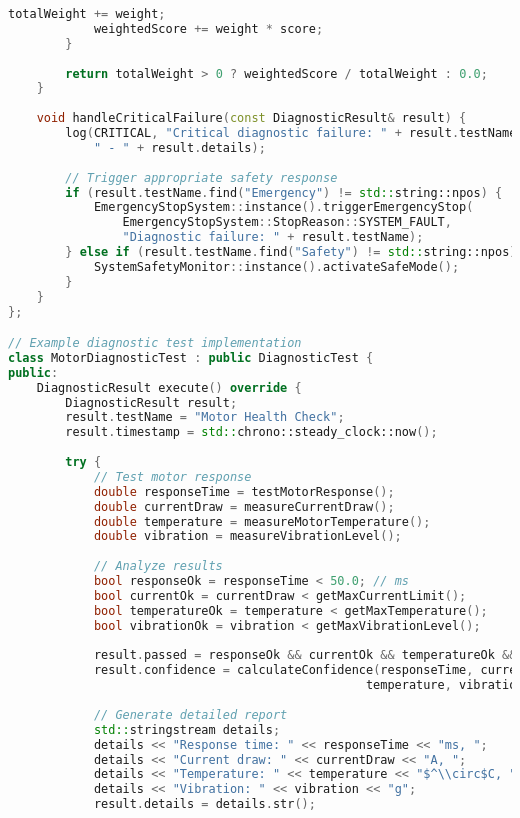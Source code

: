 \begin{lstlisting}[language=C++, caption=Self-Diagnostic System]
            totalWeight += weight;
            weightedScore += weight * score;
        }
        
        return totalWeight > 0 ? weightedScore / totalWeight : 0.0;
    }
    
    void handleCriticalFailure(const DiagnosticResult& result) {
        log(CRITICAL, "Critical diagnostic failure: " + result.testName + 
            " - " + result.details);
        
        // Trigger appropriate safety response
        if (result.testName.find("Emergency") != std::string::npos) {
            EmergencyStopSystem::instance().triggerEmergencyStop(
                EmergencyStopSystem::StopReason::SYSTEM_FAULT,
                "Diagnostic failure: " + result.testName);
        } else if (result.testName.find("Safety") != std::string::npos) {
            SystemSafetyMonitor::instance().activateSafeMode();
        }
    }
};

// Example diagnostic test implementation
class MotorDiagnosticTest : public DiagnosticTest {
public:
    DiagnosticResult execute() override {
        DiagnosticResult result;
        result.testName = "Motor Health Check";
        result.timestamp = std::chrono::steady_clock::now();
        
        try {
            // Test motor response
            double responseTime = testMotorResponse();
            double currentDraw = measureCurrentDraw();
            double temperature = measureMotorTemperature();
            double vibration = measureVibrationLevel();
            
            // Analyze results
            bool responseOk = responseTime < 50.0; // ms
            bool currentOk = currentDraw < getMaxCurrentLimit();
            bool temperatureOk = temperature < getMaxTemperature();
            bool vibrationOk = vibration < getMaxVibrationLevel();
            
            result.passed = responseOk && currentOk && temperatureOk && vibrationOk;
            result.confidence = calculateConfidence(responseTime, currentDraw, 
                                                  temperature, vibration);
            
            // Generate detailed report
            std::stringstream details;
            details << "Response time: " << responseTime << "ms, ";
            details << "Current draw: " << currentDraw << "A, ";
            details << "Temperature: " << temperature << "$^\\circ$C, ";
            details << "Vibration: " << vibration << "g";
            result.details = details.str();
            

\end{lstlisting}

